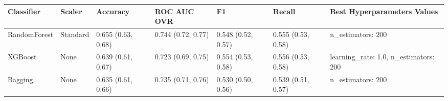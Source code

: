 \begin{tabular}{lllllll}
\toprule
Classifier & Scaler & Accuracy & ROC AUC OVR & F1 & Recall & Best Hyperparameters Values \\
\midrule
RandomForest & Standard & 0.655 (0.63, 0.68) & 0.744 (0.72, 0.77) & 0.548 (0.52, 0.57) & 0.555 (0.53, 0.58) & {{n\_estimators: 200}} \\
XGBoost & None & 0.639 (0.61, 0.67) & 0.723 (0.69, 0.75) & 0.554 (0.53, 0.58) & 0.556 (0.53, 0.58) & {{learning\_rate: 1.0, n\_estimators: 200}} \\
Bagging & None & 0.635 (0.61, 0.66) & 0.735 (0.71, 0.76) & 0.530 (0.50, 0.56) & 0.539 (0.51, 0.57) & {{n\_estimators: 200}} \\
\bottomrule
\end{tabular}
